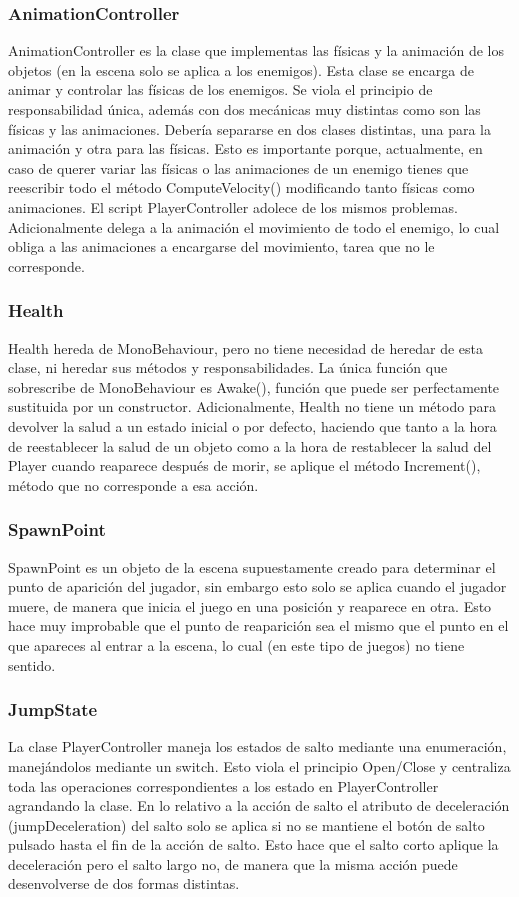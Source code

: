 \subsubsection{AnimationController}
AnimationController es la clase que implementas las físicas y la animación de los objetos (en la escena solo se aplica a los enemigos).
Esta clase se encarga de animar y controlar las físicas de los enemigos. Se viola el principio de responsabilidad única, además con dos mecánicas muy distintas como son las físicas y las animaciones. Debería separarse en dos clases distintas, una para la animación y otra para las físicas. Esto es importante porque, actualmente, en caso de querer variar las físicas o las animaciones de un enemigo tienes que reescribir todo el método ComputeVelocity() modificando tanto físicas como animaciones. El script PlayerController adolece de los mismos problemas. 
Adicionalmente delega a la animación el movimiento de todo el enemigo, lo cual obliga a las animaciones a encargarse del movimiento, tarea que no le corresponde.

\subsubsection{Health}
Health hereda de MonoBehaviour, pero no tiene necesidad de heredar de esta clase, ni heredar sus métodos y responsabilidades. La única función que sobrescribe de MonoBehaviour es Awake(), función que puede ser perfectamente sustituida por un constructor. Adicionalmente, Health no tiene un método para devolver la salud a un estado inicial o por defecto, haciendo que tanto a la hora de reestablecer la salud de un objeto como a la hora de restablecer la salud del Player cuando reaparece después de morir, se aplique el método Increment(), método que no corresponde a esa acción.

\subsubsection{SpawnPoint}
SpawnPoint es un objeto de la escena supuestamente creado para determinar el punto de aparición del jugador, sin embargo esto solo se aplica cuando el jugador muere, de manera que inicia el juego en una posición y reaparece en otra. Esto hace muy improbable que el punto de reaparición sea el mismo que el punto en el que apareces al entrar a la escena, lo cual (en este tipo de juegos) no tiene sentido.

\subsubsection{JumpState}
La clase PlayerController maneja los estados de salto mediante una enumeración, manejándolos mediante un switch. Esto viola el principio Open/Close y centraliza toda las operaciones correspondientes a los estado en PlayerController agrandando la clase. 
En lo relativo a la acción de salto el atributo de deceleración (jumpDeceleration) del salto solo se aplica si no se mantiene el botón de salto pulsado hasta el fin de la acción de salto. Esto hace que el salto corto aplique la deceleración pero el salto largo no, de manera que la misma acción puede desenvolverse de dos formas distintas. 

